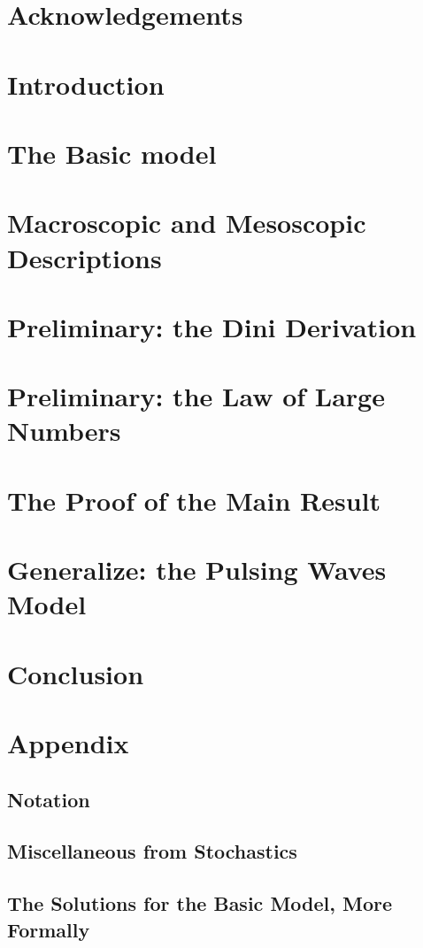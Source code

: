 \documentclass[11pt, a4paper]{scrreprt}
\begin{document}
\chapter*{Acknowledgements}


\tableofcontents


\chapter{Introduction}


\chapter{The Basic model}


\chapter{Macroscopic and Mesoscopic Descriptions}


\chapter{Preliminary: the Dini Derivation}


\chapter{Preliminary: the Law of Large Numbers}


\chapter{The Proof of the Main Result}


\chapter{Generalize: the Pulsing Waves Model}


\chapter{Conclusion}

%

\printbibliography[heading=bibintoc]

\appendix
\chapter{Appendix}

	\section{Notation}
	
	
	\section{Miscellaneous from Stochastics}
	
	
	\section{The Solutions for the Basic Model, More Formally}
	
\end{document}
